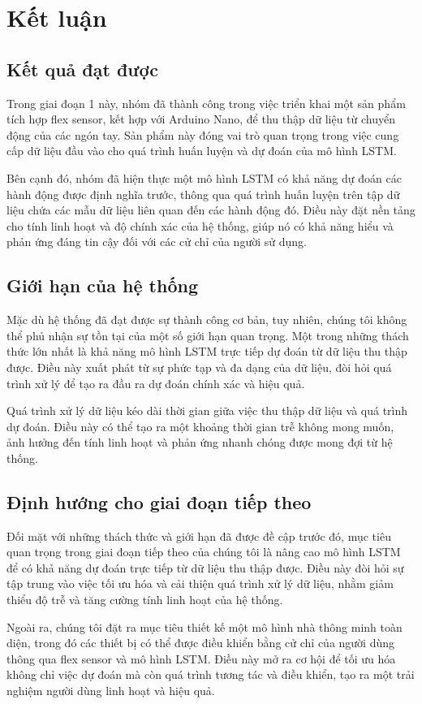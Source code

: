 \section{Kết luận}

\subsection{Kết quả đạt được}

\indent Trong giai đoạn 1 này, nhóm đã thành công trong việc triển khai một sản phẩm tích hợp flex sensor, kết hợp với Arduino Nano, để thu thập dữ liệu từ chuyển động của các ngón tay. Sản phẩm này đóng vai trò quan trọng trong việc cung cấp dữ liệu đầu vào cho quá trình huấn luyện và dự đoán của mô hình LSTM.

\indent Bên cạnh đó, nhóm đã hiện thực một mô hình LSTM có khả năng dự đoán các hành động được định nghĩa trước, thông qua quá trình huấn luyện trên tập dữ liệu chứa các mẫu dữ liệu liên quan đến các hành động đó. Điều này đặt nền tảng cho tính linh hoạt và độ chính xác của hệ thống, giúp nó có khả năng hiểu và phản ứng đáng tin cậy đối với các cử chỉ của người sử dụng.

\subsection{Giới hạn của hệ thống}

\indent Mặc dù hệ thống đã đạt được sự thành công cơ bản, tuy nhiên, chúng tôi không thể phủ nhận sự tồn tại của một số giới hạn quan trọng. Một trong những thách thức lớn nhất là khả năng mô hình LSTM trực tiếp dự đoán từ dữ liệu thu thập được. Điều này xuất phát từ sự phức tạp và đa dạng của dữ liệu, đòi hỏi quá trình xử lý để tạo ra đầu ra dự đoán chính xác và hiệu quả.

\indent Quá trình xử lý dữ liệu kéo dài thời gian giữa việc thu thập dữ liệu và quá trình dự đoán. Điều này có thể tạo ra một khoảng thời gian trễ không mong muốn, ảnh hưởng đến tính linh hoạt và phản ứng nhanh chóng được mong đợi từ hệ thống.

\subsection{Định hướng cho giai đoạn tiếp theo}

\indent Đối mặt với những thách thức và giới hạn đã được đề cập trước đó, mục tiêu quan trọng trong giai đoạn tiếp theo của chúng tôi là nâng cao mô hình LSTM để có khả năng dự đoán trực tiếp từ dữ liệu thu thập được. Điều này đòi hỏi sự tập trung vào việc tối ưu hóa và cải thiện quá trình xử lý dữ liệu, nhằm giảm thiểu độ trễ và tăng cường tính linh hoạt của hệ thống.

\indent Ngoài ra, chúng tôi đặt ra mục tiêu thiết kế một mô hình nhà thông minh toàn diện, trong đó các thiết bị có thể được điều khiển bằng cử chỉ của người dùng thông qua flex sensor và mô hình LSTM. Điều này mở ra cơ hội để tối ưu hóa không chỉ việc dự đoán mà còn quá trình tương tác và điều khiển, tạo ra một trải nghiệm người dùng linh hoạt và hiệu quả.